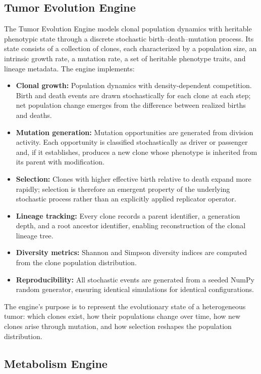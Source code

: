\documentclass[12pt,a4paper]{article}
\begin{document}
\subsection{Tumor Evolution Engine}

The Tumor Evolution Engine models clonal population dynamics with heritable phenotypic state through a discrete stochastic birth--death--mutation process. Its state consists of a collection of clones, each characterized by a population size, an intrinsic growth rate, a mutation rate, a set of heritable phenotype traits, and lineage metadata. The engine implements:

\begin{itemize}[leftmargin=*]
    \item \textbf{Clonal growth:} Population dynamics with density-dependent competition. Birth and death events are drawn stochastically for each clone at each step; net population change emerges from the difference between realized births and deaths.
    \item \textbf{Mutation generation:} Mutation opportunities are generated from division activity. Each opportunity is classified stochastically as driver or passenger and, if it establishes, produces a new clone whose phenotype is inherited from its parent with modification.
    \item \textbf{Selection:} Clones with higher effective birth relative to death expand more rapidly; selection is therefore an emergent property of the underlying stochastic process rather than an explicitly applied replicator operator.
    \item \textbf{Lineage tracking:} Every clone records a parent identifier, a generation depth, and a root ancestor identifier, enabling reconstruction of the clonal lineage tree.
    \item \textbf{Diversity metrics:} Shannon and Simpson diversity indices are computed from the clone population distribution.
    \item \textbf{Reproducibility:} All stochastic events are generated from a seeded NumPy random generator, ensuring identical simulations for identical configurations.
\end{itemize}

The engine's purpose is to represent the evolutionary state of a heterogeneous tumor: which clones exist, how their populations change over time, how new clones arise through mutation, and how selection reshapes the population distribution.

\subsection{Metabolism Engine}
\end{document}
